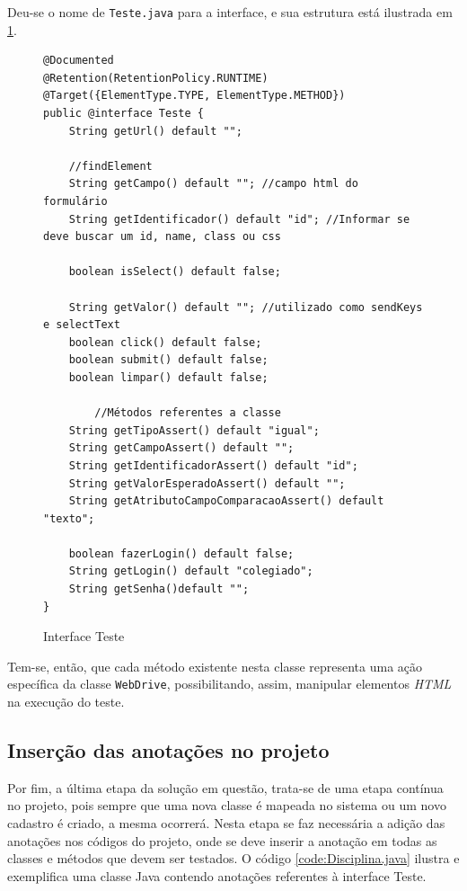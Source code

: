 \documentclass[tg]{mdtufsm}
\begin{document}
Deu-se o nome de \texttt{Teste.java} para a interface, e sua estrutura está ilustrada em \ref{code:Teste.java}.

\begin{figure}[!htt]
\begin{lstlisting}
@Documented
@Retention(RetentionPolicy.RUNTIME)
@Target({ElementType.TYPE, ElementType.METHOD})
public @interface Teste {
    String getUrl() default "";

    //findElement
    String getCampo() default ""; //campo html do formulário
    String getIdentificador() default "id"; //Informar se deve buscar um id, name, class ou css

    boolean isSelect() default false;

    String getValor() default ""; //utilizado como sendKeys e selectText
    boolean click() default false;
    boolean submit() default false;
    boolean limpar() default false;
	
		//Métodos referentes a classe
    String getTipoAssert() default "igual";
    String getCampoAssert() default "";
    String getIdentificadorAssert() default "id";
    String getValorEsperadoAssert() default "";
    String getAtributoCampoComparacaoAssert() default "texto";

    boolean fazerLogin() default false;
    String getLogin() default "colegiado";
    String getSenha()default "";
}
\end{lstlisting}
	\caption{Interface Teste}
	\label{code:Teste.java}
\end{figure}

Tem-se, então, que cada método existente nesta classe representa uma ação específica da classe \texttt{WebDrive}, possibilitando, assim, manipular elementos \emph{HTML} na execução do teste.

\subsection{Inserção das anotações no projeto}
Por fim, a última etapa da solução em questão, trata-se de uma etapa contínua no projeto, pois sempre que uma nova classe é mapeada no sistema ou um novo cadastro é criado, a mesma ocorrerá. Nesta etapa se faz necessária a
adição das anotações nos códigos do projeto, onde se deve inserir a anotação em todas as classes e métodos que devem ser testados.
O código \ref{code:Disciplina.java} ilustra e exemplifica uma classe Java contendo anotações referentes à interface Teste.
\end{document}
